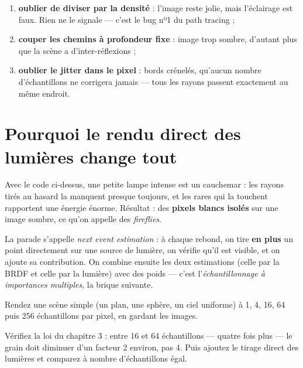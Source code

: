 \begin{nkpiege}
\begin{enumerate}
  \item \textbf{oublier de diviser par la densité} : l'image reste jolie, mais
        l'éclairage est faux. Rien ne le signale — c'est le bug nº1 du path
        tracing ;
  \item \textbf{couper les chemins à profondeur fixe} : image trop sombre,
        d'autant plus que la scène a d'inter-réflexions ;
  \item \textbf{oublier le jitter dans le pixel} : bords crénelés, qu'aucun
        nombre d'échantillons ne corrigera jamais — tous les rayons passent
        exactement au même endroit.
\end{enumerate}
\end{nkpiege}

\section{Pourquoi le rendu direct des lumières change tout}

Avec le code ci-dessus, une petite lampe intense est un cauchemar : les rayons
tirés au hasard la manquent presque toujours, et les rares qui la touchent
rapportent une énergie énorme. Résultat : des \textbf{pixels blancs isolés} sur
une image sombre, ce qu'on appelle des \emph{fireflies}.

La parade s'appelle \emph{next event estimation} : à chaque rebond, on tire
\textbf{en plus} un point directement sur une source de lumière, on vérifie
qu'il est visible, et on ajoute sa contribution. On combine ensuite les deux
estimations (celle par la BRDF et celle par la lumière) avec des poids —
c'est l'\emph{échantillonnage à importances multiples}, la brique suivante.

\begin{nkexo}
Rendez une scène simple (un plan, une sphère, un ciel uniforme) à 1, 4, 16,
64 puis 256 échantillons par pixel, en gardant les images.

Vérifiez la loi du chapitre 3 : entre 16 et 64 échantillons — quatre fois plus
— le grain doit diminuer d'un facteur 2 environ, pas 4. Puis ajoutez le tirage
direct des lumières et comparez à nombre d'échantillons égal.
\end{nkexo}
